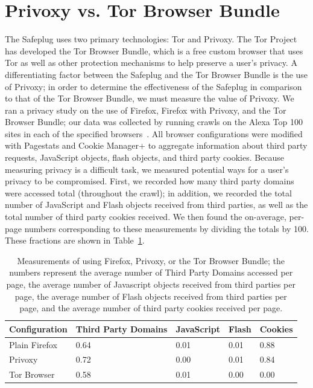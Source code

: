 \documentclass[letterpaper,twocolumn,10pt]{article}
\begin{document}
\section{Privoxy vs. Tor Browser Bundle}
The Safeplug uses two primary technologies: Tor and Privoxy.  The Tor Project has developed the Tor Browser Bundle, which is a free custom browser that uses Tor as well as other protection mechanisms to help preserve a user's privacy.  A differentiating factor between the Safeplug and the Tor Browser Bundle is the use of Privoxy; in order to determine the effectiveness of the Safeplug in comparison to that of the Tor Browser Bundle, we must measure the value of Privoxy.  We ran a privacy study on the use of Firefox, Firefox with Privoxy, and the Tor Browser Bundle; our data was collected by running crawls on the Alexa Top 100 sites in each of the specified browsers~\cite{alexa}.  All browser configurations were modified with Pagestats \cite{pagestats} and Cookie Manager+ \cite{cookiemonster} to aggregate information about third party requests, JavaScript objects, flash objects, and third party cookies.  Because measuring privacy is a difficult task, we measured potential ways for a user's privacy to be compromised.  First, we recorded how many third party domains were accessed total (throughout the crawl); in addition, we recorded the total number of JavaScript and Flash objects received from third parties, as well as the total number of third party cookies received.  We then found the on-average, per-page numbers corresponding to these measurements by dividing the totals by 100.  These fractions are shown in Table~\ref{tbb}.

\begin{table}[!t]
\renewcommand{\arraystretch}{1.3}
\caption{Measurements of using Firefox, Privoxy, or the Tor Browser Bundle; the numbers represent the average number of Third Party Domains accessed per page, the average number of Javascript objects received from third parties per page, the average number of Flash objects received from third parties per page, and the average number of third party cookies received per page.}
\label{tbb}
\centering
\small
	\begin{tabular}{| p{1.85cm} | p{1.3cm} | p{1.25cm} | p{.7cm} | p{1cm} |}
	\hline
		Configuration & Third Party Domains & JavaScript & Flash & Cookies \\ \hline
		Plain Firefox	& 0.64 & 0.01 & 0.01 & 0.88 \\ \hline
		Privoxy & 0.72 & 0.00 & 0.01 & 0.84 \\ \hline
		Tor Browser	& 0.58 & 0.01 & 0.00 & 0.00 \\ \hline
	\end{tabular}
\end{table}
\end{document}
